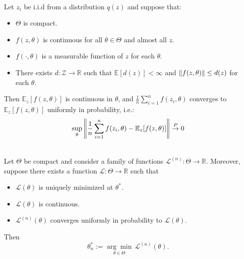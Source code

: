 \begin{lemma} \cite[Lemma 2.4]{whitney1994estimation} \\
    \label{ch2:lemma:ULLN}
    Let $z_i$ be i.i.d from a distribution $q(z)$ and suppose that:
    \begin{itemize}
        \item $\Theta$ is compact.
        \item $f(z,\theta)$ is continuous for all $\theta \in \Theta$ and almost all $z$.
        \item $f(\cdot, \theta)$ is a measurable function of $z$ for each $\theta$.
        \item There exists $d: \mathcal{Z} \xrightarrow{} \mathbb{R}$ such that $\mathbb{E}[d(z)]<\infty$ and $\left\lVert f(z,\theta) \right\rVert \leq d(z)$ for each $\theta$.
    \end{itemize}
    Then $\mathbb{E}_{z}[f(z,\theta)]$ is continuous in $\theta$, and $\frac{1}{n}\sum_{i=1}^n f(z_i, \theta)$ converges to $\mathbb{E}_{z}[f(z,\theta)]$ uniformly in probability, i.e.:
    \begin{gather*}
        \sup_\theta \left\lVert \frac{1}{n}\sum_{i=1}^n f(z_i, \theta) - \mathbb{E}_{z}[f(z,\theta)] \right\rVert \overset{P}{\to} 0
    \end{gather*}

\end{lemma}

\begin{lemma} \cite[Theorem 2.1]{whitney1994estimation} \\
    \label{ch2:lemma:consistency}
    Let $\Theta$ be compact and consider a family of functions $\mathcal{L}^{(n)}: \Theta \to \mathbb{R}$. Moreover, suppose there exists a function $\mathcal{L}: \Theta \to \mathbb{R}$ such that
    \begin{itemize}
        \item $\mathcal{L}(\theta)$ is uniquely minimized at $\theta^\ast$.
        \item $\mathcal{L}(\theta)$ is continuous.
        \item $\mathcal{L}^{(n)}(\theta)$ converges uniformly in probability to $\mathcal{L}(\theta)$.
    \end{itemize}
    Then $$\theta^\ast_n := \underset{\theta \in \Theta}{\arg\min} \, \mathcal{L}^{(n)}(\theta).$$
\end{lemma}


